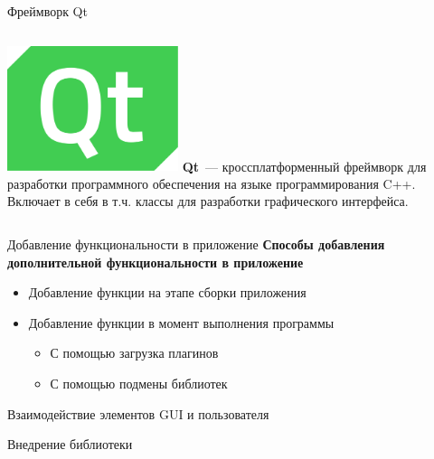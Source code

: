 \documentclass[aspectratio=1610]{beamer}
\begin{document}
\begin{frame}{Фреймворк Qt}
    \begin{columns}
		\centering
		\includegraphics[width=5cm]{Qt}
		\textbf{Qt}~— кроссплатформенный фреймворк для разработки программного обеспечения на языке программирования C++. Включает в себя в т.ч. классы для разработки
		графического интерфейса.
	\end{columns}
\end{frame}

\begin{frame}{Добавление функциональности в приложение}
	\textbf{Способы добавления дополнительной функциональности в приложение}
	\begin{itemize}
		\item Добавление функции на этапе сборки приложения
		\item Добавление функции в момент выполнения программы
		\begin{itemize}
			\item С помощью загрузка плагинов
			\item С помощью подмены библиотек
		\end{itemize}
	\end{itemize}
\end{frame}

\begin{frame}{Взаимодействие элементов GUI и пользователя}
	\begin{figure}
		
	\end{figure}
\end{frame}

\begin{frame}{Внедрение библиотеки}
	\begin{figure}
		
	\end{figure}
\end{frame}
\end{document}
